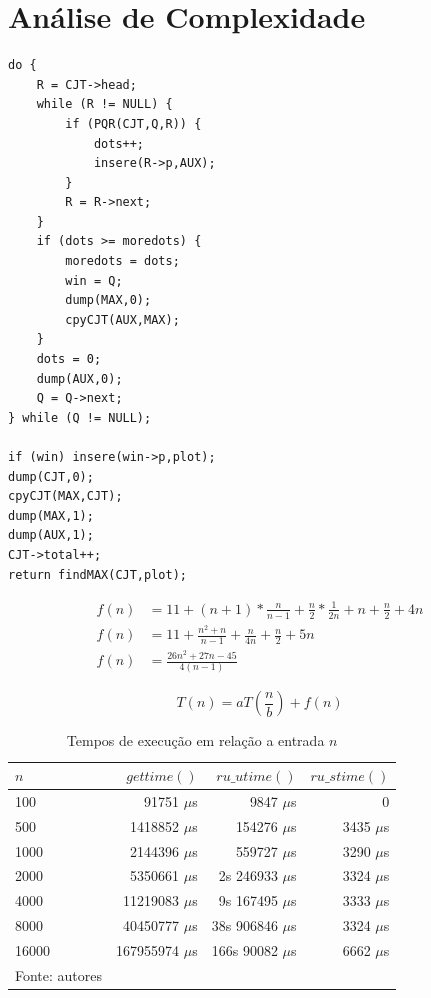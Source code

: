 \documentclass[12pt,a4paper]{article}
\begin{document}
\section{Análise de Complexidade}

\begin{BVerbatim}
do {
	R = CJT->head;
	while (R != NULL) {
		if (PQR(CJT,Q,R)) {
			dots++;
			insere(R->p,AUX);
		}
		R = R->next;
	}
	if (dots >= moredots) {
		moredots = dots;
		win = Q;
		dump(MAX,0);
		cpyCJT(AUX,MAX);
	}
	dots = 0;
	dump(AUX,0);
	Q = Q->next;
} while (Q != NULL);
	
if (win) insere(win->p,plot);
dump(CJT,0);
cpyCJT(MAX,CJT);
dump(MAX,1);
dump(AUX,1);
CJT->total++;
return findMAX(CJT,plot);
\end{BVerbatim}

\[ \begin{split}
f(n) &= 11 + (n+1)*\frac{n}{n-1}+\frac{n}{2}*\frac{1}{2n}+n+\frac{n}{2}+4n \\
f(n) &= 11 + \frac{n^2+n}{n-1}+\frac{n}{4n}+\frac{n}{2}+5n \\
f(n) &= \frac{26n^2+27n-45}{4(n-1)}
\end{split} \]

\[T(n)=aT(\frac{n}{b})+f(n)\]

\pagebreak

\begin{table}[!h]
	\centering
	\caption{Tempos de execução em relação a entrada $n$}
	\label{tab:tempos}
	\begin{tabular}{lrrr}
		\toprule 
		$n$ & $gettime()$ & $ru\_utime()$ & $ru\_stime()$ \\ 
		\midrule
		100 & 91751 $\mu$s & 9847 $\mu$s & 0 \\
		500 & 1418852 $\mu$s & 154276 $\mu$s & 3435 $\mu$s \\
		1000 & 2144396 $\mu$s & 559727 $\mu$s & 3290 $\mu$s \\
		2000 & 5350661 $\mu$s & 2s 246933 $\mu$s & 3324 $\mu$s \\
		4000 & 11219083 $\mu$s & 9s 167495 $\mu$s & 3333 $\mu$s \\
		8000 & 40450777 $\mu$s & 38s 906846 $\mu$s & 3324 $\mu$s \\
		16000 & 167955974 $\mu$s & 166s 90082 $\mu$s & 6662 $\mu$s \\
		\bottomrule
		\footnotesize Fonte: autores
	\end{tabular}
\end{table}
\end{document}
